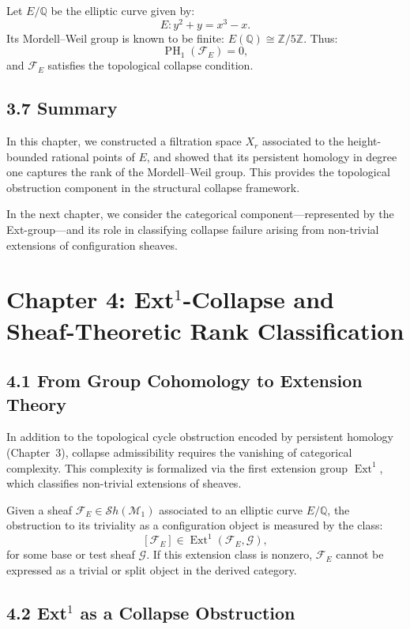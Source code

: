 \documentclass[11pt]{article}
\DeclareMathOperator{\Ext}{Ext}
\DeclareMathOperator{\PH}{PH}
\begin{document}
Let \( E/\mathbb{Q} \) be the elliptic curve given by:
\[
E: y^2 + y = x^3 - x.
\]
Its Mordell–Weil group is known to be finite: \( E(\mathbb{Q}) \cong \mathbb{Z}/5\mathbb{Z} \). Thus:
\[
\PH_1(\mathcal{F}_E) = 0,
\]
and \( \mathcal{F}_E \) satisfies the topological collapse condition.

\subsection*{3.7 Summary}

In this chapter, we constructed a filtration space \( X_r \) associated to the height-bounded rational points of \( E \), and showed that its persistent homology in degree one captures the rank of the Mordell–Weil group. This provides the topological obstruction component in the structural collapse framework.

In the next chapter, we consider the categorical component—represented by the Ext-group—and its role in classifying collapse failure arising from non-trivial extensions of configuration sheaves.



\section{Chapter 4: Ext$^1$-Collapse and Sheaf-Theoretic Rank Classification}
\label{sec:ext1-collapse}

\subsection*{4.1 From Group Cohomology to Extension Theory}

In addition to the topological cycle obstruction encoded by persistent homology (Chapter~3), collapse admissibility requires the vanishing of categorical complexity. This complexity is formalized via the first extension group \( \Ext^1 \), which classifies non-trivial extensions of sheaves.

Given a sheaf \( \mathcal{F}_E \in \mathcal{S}h(\mathcal{M}_1) \) associated to an elliptic curve \( E/\mathbb{Q} \), the obstruction to its triviality as a configuration object is measured by the class:
\[
[\mathcal{F}_E] \in \Ext^1(\mathcal{F}_E, \mathcal{G}),
\]
for some base or test sheaf \( \mathcal{G} \). If this extension class is nonzero, \( \mathcal{F}_E \) cannot be expressed as a trivial or split object in the derived category.

\subsection*{4.2 Ext$^1$ as a Collapse Obstruction}
\end{document}
